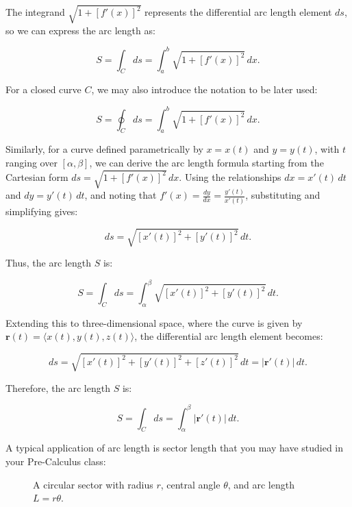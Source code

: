 \noindent The integrand \( \sqrt{ 1 + [f'(x)]^2 } \) represents the differential arc length element \( ds \), so we can express the arc length as:

\[
S = \int_{C} ds = \int_{a}^{b} \sqrt{ 1 + [f'(x)]^2 } \, dx.
\]

\noindent For a closed curve $C$, we may also introduce the notation to be later used:

\[
S = \oint_{C} ds = \int_{a}^{b} \sqrt{ 1 + [f'(x)]^2 } \, dx.
\]

\noindent Similarly, for a curve defined parametrically by \( x = x(t) \) and \( y = y(t) \), with \( t \) ranging over \( [\alpha, \beta] \), we can derive the arc length formula starting from the Cartesian form \( ds = \sqrt{1 + [f'(x)]^2} \, dx \). Using the relationships \( dx = x'(t) \, dt \) and \( dy = y'(t) \, dt \), and noting that \( f'(x) = \frac{dy}{dx} = \frac{y'(t)}{x'(t)} \), substituting and simplifying gives:

\[
ds = \sqrt{ [x'(t)]^2 + [y'(t)]^2 } \, dt.
\]

\noindent Thus, the arc length \( S \) is:

\[
S = \int_{C} ds = \int_{\alpha}^{\beta} \sqrt{ [x'(t)]^2 + [y'(t)]^2 } \, dt.
\]

\noindent Extending this to three-dimensional space, where the curve is given by \( \mathbf{r}(t) = \langle x(t), y(t), z(t) \rangle \), the differential arc length element becomes:

\[
ds = \sqrt{ [x'(t)]^2 + [y'(t)]^2 + [z'(t)]^2 } \, dt = \left| \mathbf{r}'(t) \right| \, dt.
\]

\noindent Therefore, the arc length \( S \) is:

\[
S = \int_{C} ds = \int_{\alpha}^{\beta} \left| \mathbf{r}'(t) \right| \, dt.
\]

\noindent A typical application of arc length is sector length that you may have studied in your Pre-Calculus class:

\begin{figure}[H]
    \centering
    \caption{A circular sector with radius \( r \), central angle \( \theta \), and arc length \( L = r\theta \).}
\end{figure}


